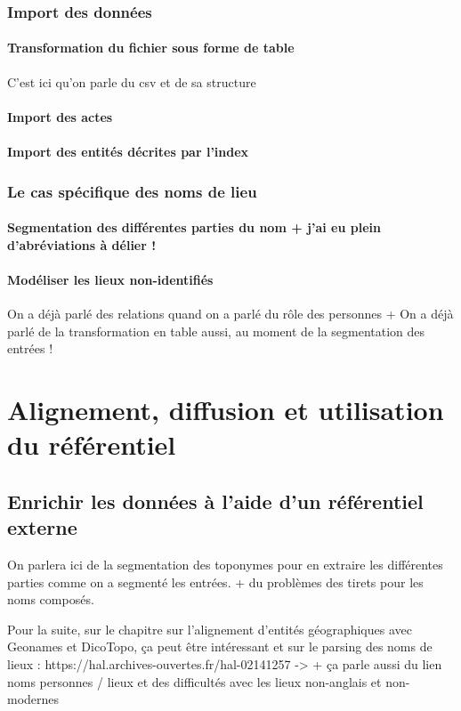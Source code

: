 \documentclass[a4paper,12pt,twoside]{book}
\begin{document}
	\section{Import des données}
	\subsection{Transformation du fichier sous forme de table}
	C'est ici qu'on parle du csv et de sa structure
	\subsection{Import des actes}
	\subsection{Import des entités décrites par l’index}
	\section{Le cas spécifique des noms de lieu}
	\subsection{Segmentation des différentes parties du nom + j’ai eu plein d’abréviations à délier !}
	\subsection{Modéliser les lieux non-identifiés}
	
	
	On a déjà parlé des relations quand on a parlé du rôle des personnes + On a déjà parlé de la transformation en table aussi, au moment de la segmentation des entrées !
	
	\part{Alignement, diffusion et utilisation du référentiel}
	
	\chapter{Enrichir les données à l’aide d’un référentiel externe}
	
	On parlera ici de la segmentation des toponymes pour en extraire les différentes parties comme on a segmenté les entrées. + du problèmes des tirets pour les noms composés.
	
	Pour la suite, sur le chapitre sur l'alignement d'entités géographiques avec Geonames et DicoTopo, ça peut être intéressant et sur le parsing des noms de lieux : https://hal.archives-ouvertes.fr/hal-02141257
	-> + ça parle aussi du lien noms personnes / lieux et des difficultés avec les lieux non-anglais et non-modernes
	
\end{document}
